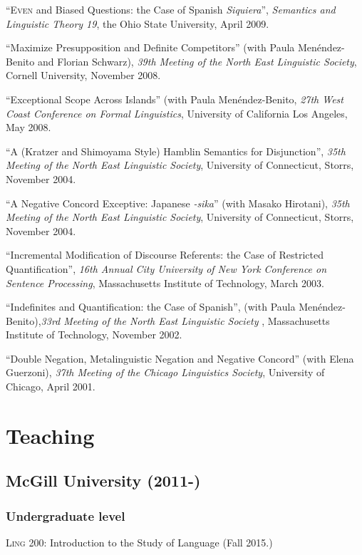 \documentclass[11pt]{article}
\begin{document}
``\textsc{Even} and Biased Questions: the Case of Spanish \textit{Siquiera}'', \textit{Semantics and Linguistic Theory 19}, the Ohio State University, April 2009. 

``Maximize Presupposition and Definite Competitors'' (with
  Paula Men\'endez-Benito and Florian Schwarz), \textit{39th
  Meeting of the North East Linguistic Society}, Cornell University, November 2008. 


``Exceptional Scope Across Islands'' (with Paula Men\'endez-Benito, \textit{27th West Coast Conference on
  Formal Linguistics}, University of California Los Angeles, May 2008. 


``A (Kratzer and Shimoyama Style) Hamblin Semantics for Disjunction'', \textit{35th
  Meeting of the North East Linguistic Society}, University of Connecticut, Storrs, November 2004. 


``A Negative Concord Exceptive: Japanese \textit{-sika}'' (with Masako Hirotani), \textit{35th
  Meeting of the North East Linguistic Society}, University of Connecticut, Storrs, November 2004. 


``Incremental Modification of Discourse Referents: the Case of Restricted Quantification'', \textit{16th Annual City University of New York Conference on Sentence Processing}, Massachusetts Institute of Technology, March 2003. 

``Indefinites and Quantification: the Case of Spanish'', (with Paula Men\'endez-Benito),\textit{33rd
  Meeting of the North East Linguistic Society} , Massachusetts Institute of Technology,  November 2002. 

``Double Negation, Metalinguistic Negation and Negative
Concord'' (with Elena Guerzoni), \textit{37th Meeting of the Chicago
  Linguistics Society}, University of Chicago, April 2001. 

\section*{Teaching}

\subsection*{McGill University (2011-)}

\subsubsection*{Undergraduate level}

\textsc{Ling} 200: Introduction to the Study of Language (Fall 2015.)
\end{document}
